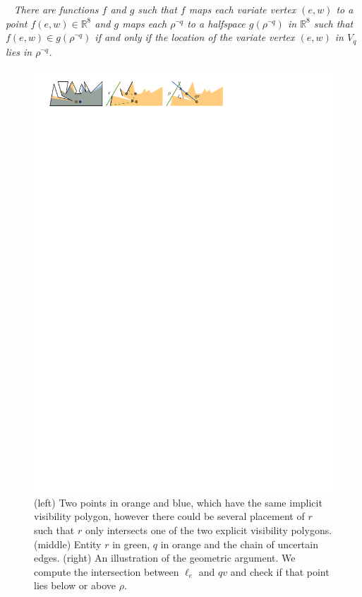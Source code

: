 \documentclass[UKenglish]{lipics-v2019}
\newcommand{\thmheadfont}{\textcolor{darkgray}{$\blacktriangleright$}\nobreakspace\sffamily\bfseries}
\newenvironment{repeatenv}[2]%
  {\smallskip\noindent {\thmheadfont #1~\ref{#2}.}\ \slshape}
  {\normalfont}
\newenvironment{repeatlemma}      [1]{\begin{repeatenv}{Lemma}{#1}}      {\end{repeatenv}}
\newcommand{\mkmbb}[1]{\ensuremath{\mathbb{#1}}\xspace}
\newcommand{\R}{\mkmbb{R}}
\begin{document}
\begin{repeatlemma}{lem:query_static}
  There are functions $f$ and $g$ such that $f$ maps each variate vertex
  $(e,w)$ to a point $f(e,w) \in \R^8$ and $g$ maps each $\rho^{\neg q}$ to a
  halfspace $g(\rho^{\neg q})$ in $\R^8$ such that $f(e,w) \in g(\rho^{\neg q})$ if and only
  if the location of the variate vertex $(e,w)$ in $V_q$ lies in $\rho^{\neg q}$.
\end{repeatlemma}


\begin{figure}[tb]
    \centering
    \includegraphics[]{../pointline}
    \caption{ (left) Two points in orange and blue, which have the same implicit visibility polygon, however there could be several placement of $r$ such that $r$ only intersects one of the two explicit visibility polygons. (middle) Entity $r$ in green, $q$ in orange and the chain of uncertain edges. (right) An illustration of the geometric argument. We compute the intersection between $\ell_e$ and $qv$ and check if that point lies below or above $\rho$.}
    \label{fig:pointline}
\end{figure}
\end{document}
